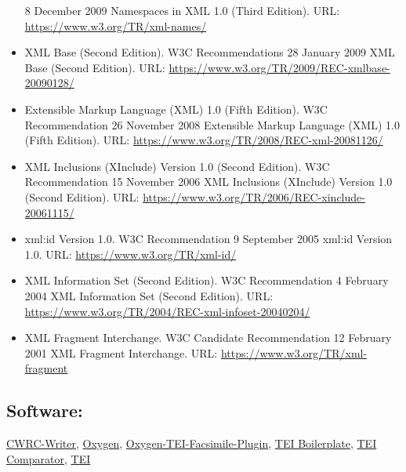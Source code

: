 \documentclass{article}
\begin{document}
\begin{itemize}
                              8 December 2009 Namespaces in XML 1.0 (Third Edition). URL: \url{https://www.w3.org/TR/xml-names/}\item XML Base (Second Edition). W3C Recommendations 28
                              January 2009 XML Base (Second Edition). URL: \url{https://www.w3.org/TR/2009/REC-xmlbase-20090128/}\item Extensible Markup Language (XML) 1.0 (Fifth Edition).
                              W3C Recommendation 26 November 2008 Extensible Markup Language (XML) 1.0 (Fifth
                              Edition). URL: \url{https://www.w3.org/TR/2008/REC-xml-20081126/}\item XML Inclusions (XInclude) Version 1.0 (Second Edition).
                              W3C Recommendation 15 November 2006 XML Inclusions (XInclude) Version 1.0 (Second
                              Edition). URL: \url{https://www.w3.org/TR/2006/REC-xinclude-20061115/}\item xml:id Version 1.0. W3C Recommendation 9 September
                              2005 xml:id Version 1.0. URL: \url{https://www.w3.org/TR/xml-id/}\item XML Information Set (Second Edition). W3C Recommendation
                              4 February 2004 XML Information Set (Second Edition). URL: \url{https://www.w3.org/TR/2004/REC-xml-infoset-20040204/}\item XML Fragment Interchange. W3C Candidate Recommendation
                              12 February 2001 XML Fragment Interchange. URL: \url{https://www.w3.org/TR/xml-fragment}\end{itemize}\subsection*{Software:}\href{https://wiki.tei-c.org/index.php/CWRC-Writer}{CWRC-Writer}, \href{http://oxygenxml.com/}{Oxygen}, \href{https://github.com/oxygenxml/TEI-Facsimile-Plugin}{Oxygen-TEI-Facsimile-Plugin}, \href{http://dcl.ils.indiana.edu/teibp/index.html}{TEI Boilerplate}, \href{https://sourceforge.net/projects/tei-comparator/}{TEI
                           Comparator}, \href{https://teipublisher.com/index.html}{TEI
}
\end{document}
